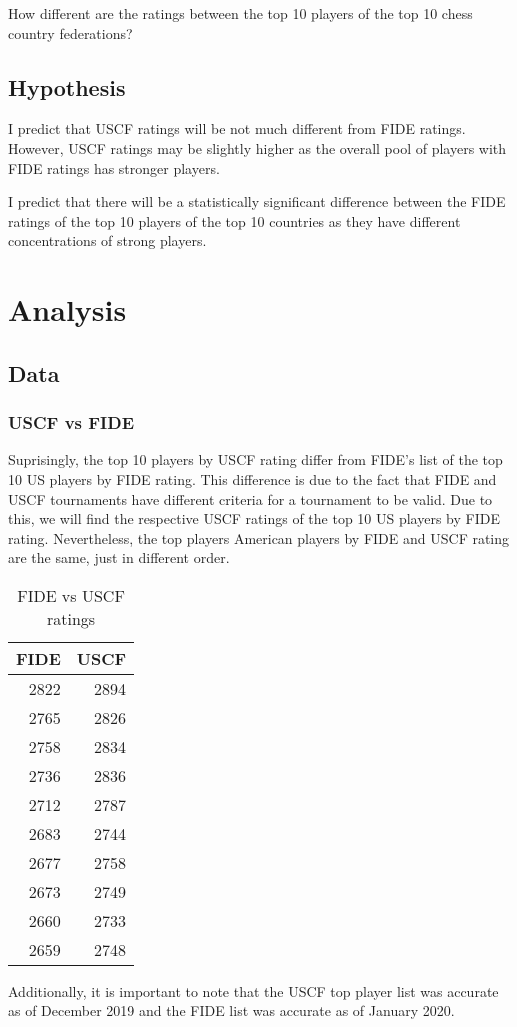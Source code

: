 \documentclass[12pt]{article}
\begin{document}
How different are the ratings between the top 10 players of the top 10 chess country federations?
\subsection{Hypothesis}
I predict that USCF ratings will be not much different from FIDE ratings. However, USCF ratings may be slightly higher as the overall pool of players with FIDE ratings has stronger players.

I predict that there will be a statistically significant difference between the FIDE ratings of the top 10 players of the top 10 countries as they have different concentrations of strong players. 

\section{Analysis}
\subsection{Data}
\subsubsection{USCF vs FIDE}
Suprisingly, the top 10 players by USCF rating differ from FIDE's list of the top 10 US players by FIDE rating. This difference is due to the fact that FIDE and USCF tournaments have different criteria for a tournament to be valid. Due to this, we will find the respective USCF ratings of the top 10 US players by FIDE rating. Nevertheless, the top players American players by FIDE and USCF rating are the same, just in different order.

\begin{table}
\begin{center}
\begin{tabular}{rr}
FIDE & USCF\\
\hline
2822 & 2894\\
2765 & 2826\\
2758 & 2834\\
2736 & 2836\\
2712 & 2787\\
2683 & 2744\\
2677 & 2758\\
2673 & 2749\\
2660 & 2733\\
2659 & 2748\\
\end{tabular}
    \caption{FIDE vs USCF ratings}
\end{center}
\end{table}
Additionally, it is important to note that the USCF top player list was accurate as of December 2019 and the FIDE list was accurate as of January 2020. 
\end{document}
